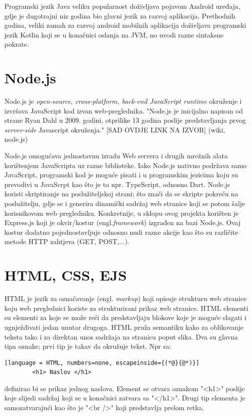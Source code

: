 \documentclass[times, utf8, zavrsni, numeric]{fer}
\begin{document}
	Programski jezik Java veliku popularnost doživljava pojavom Android uređaja, gdje je dugotrajni niz godina bio glavni jezik za razvoj aplikacija. Prethodnih godina, veliki zamah za razvoj android mobilnih aplikacija doživljava programski jezik 
	Kotlin koji se u konačnici oslanja na JVM, no uvodi razne sintaksne pokrate. 
	
	
	\section{Node.js}
	Node.js je \textit{open-source, cross-platform, back-end JavaScript runtime} okruženje i izvršava JavaScript kod izvan web-preglednika\cite{node}. "Node.js je inicijalno napisan od strane  Ryan Dahl u 2009. godini, otprilike 13 godina poslije predstavljanja
	prvog  \textit{server-side} Javascript okruženja." [SAD OVDJE LINK NA IZVOR] (wiki, node.js)
	
	Node.js omogućava jednostavnu izradu Web servera i drugih mrežnih alata korištenjem JavaScripta uz razne biblioteke. Iako Node.js nativno podržava samo JavaScript, programski kod je moguće pisati i u programskim jezicima koju su prevodivi u JavaScrpt kao 
	što je to npr. TypeScript, odnosno Dart. Node.js koristi skriptiranje na poslužiteljskoj strani; što znači da se skripte pokreću na poslužitelju, gdje se i generira dinamički sadržaj web stranice koji se potom šalje korisnikovom web pregledniku. 
	Konkretnije, u sklopu ovog projekta korišten je Express.js koji je okvir/kostur (engl.\textit{framework}) izgrađen na bazi Node.js. Ovaj kostur dodatno pojednostavljuje odnosno nudi razne akcije kao što su različite metode HTTP zahtjeva (GET, POST,...).
	
	
	\section{HTML, CSS, EJS}
	HTML je jezik za označavanje (engl. \textit{markup}) koji opisuje strukturu web stranice koju web preglednici koriste za strukturirani prikaz web stranice. HTML elementi su elementi za koje se može reći da predstavljaju blokove koje je moguće slagati
	i ugnježđivati jedan unutar drugoga. HTML pruža semantiku kako za oblikovanje teksta tako i za direktan unos sadržaja na stranicu poput slika.
	Dva su glavna tipa oznake; prvi tip je takav da okružuje tekst. Npr sa: 
		\begin{lstlisting}[language = HTML, numbers=none, escapeinside={(*@}{@*)}]
		<h1> Naslov </h1>
		\end{lstlisting}
		definirao bi se prikaz jednog naslova. Element se otvara oznakom "<h1>" poslije koje slijedi sadržaj koji se u konačnici zatvara sa "</h1>". Drugi tip elementa je samozatvarajući kao što je "<br />" koji predstavlja prelom retka.
\end{document}
